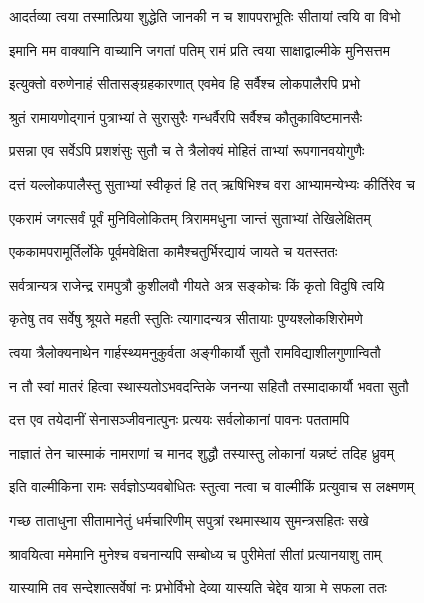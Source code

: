 \twolineshloka
{आदर्तव्या त्वया तस्मात्प्रिया शुद्धेति जानकी}
{न च शापपराभूतिः सीतायां त्वयि वा विभो}%

\twolineshloka
{इमानि मम वाक्यानि वाच्यानि जगतां पतिम्}
{रामं प्रति त्वया साक्षाद्वाल्मीके मुनिसत्तम}%

\twolineshloka
{इत्युक्तो वरुणेनाहं सीतासङ्ग्रहकारणात्}
{एवमेव हि सर्वैश्च लोकपालैरपि प्रभो}%

\twolineshloka
{श्रुतं रामायणोद्गानं पुत्राभ्यां ते सुरासुरैः}
{गन्धर्वैरपि सर्वैश्च कौतुकाविष्टमानसैः}%

\twolineshloka
{प्रसन्ना एव सर्वेऽपि प्रशशंसुः सुतौ च ते}
{त्रैलोक्यं मोहितं ताभ्यां रूपगानवयोगुणैः}%

\twolineshloka
{दत्तं यल्लोकपालैस्तु सुताभ्यां स्वीकृतं हि तत्}
{ऋषिभिश्च वरा आभ्यामन्येभ्यः कीर्तिरेव च}%

\twolineshloka
{एकरामं जगत्सर्वं पूर्वं मुनिविलोकितम्}
{त्रिराममधुना जान्तं सुताभ्यां तेखिलेक्षितम्}%

\twolineshloka
{एककामपरामूर्तिर्लोके पूर्वमवेक्षिता}
{कामैश्चतुर्भिरद्यायं जायते च यतस्ततः}%

\twolineshloka
{सर्वत्रान्यत्र राजेन्द्र रामपुत्रौ कुशीलवौ}
{गीयते अत्र सङ्कोचः किं कृतो विदुषि त्वयि}%

\twolineshloka
{कृतेषु तव सर्वेषु श्रूयते महती स्तुतिः}
{त्यागादन्यत्र सीतायाः पुण्यश्लोकशिरोमणे}%

\twolineshloka
{त्वया त्रैलोक्यनाथेन गार्हस्थ्यमनुकुर्वता}
{अङ्गीकार्यौ सुतौ रामविद्याशीलगुणान्वितौ}%

\twolineshloka
{न तौ स्वां मातरं हित्वा स्थास्यतोऽभवदन्तिके}
{जनन्या सहितौ तस्मादाकार्यौ भवता सुतौ}%

\twolineshloka
{दत्त एव तयेदानीं सेनासञ्जीवनात्पुनः}
{प्रत्ययः सर्वलोकानां पावनः पततामपि}%

\twolineshloka
{नाज्ञातं तेन चास्माकं नामराणां च मानद}
{शुद्धौ तस्यास्तु लोकानां यन्नष्टं तदिह ध्रुवम्}%


\twolineshloka
{इति वाल्मीकिना रामः सर्वज्ञोऽप्यवबोधितः}
{स्तुत्वा नत्वा च वाल्मीकिं प्रत्युवाच स लक्ष्मणम्}%

\twolineshloka
{गच्छ ताताधुना सीतामानेतुं धर्मचारिणीम्}
{सपुत्रां रथमास्थाय सुमन्त्रसहितः सखे}%

\twolineshloka
{श्रावयित्वा ममेमानि मुनेश्च वचनान्यपि}
{सम्बोध्य च पुरीमेतां सीतां प्रत्यानयाशु ताम्}%


\twolineshloka
{यास्यामि तव सन्देशात्सर्वेषां नः प्रभोर्विभो}
{देव्या यास्यति चेद्देव यात्रा मे सफला ततः}%

